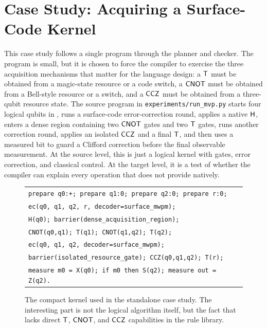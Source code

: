 \section{Case Study: Acquiring a Surface-Code Kernel}
\label{sec:case-study}

This case study follows a single  program through the planner and checker.
The program is small, but it is chosen to force the compiler to exercise the three acquisition mechanisms that matter for the language design: a $\mathsf{T}$ must be obtained from a magic-state resource or a code switch, a $\mathsf{CNOT}$ must be obtained from a Bell-style resource or a switch, and a $\mathsf{CCZ}$ must be obtained from a three-qubit resource state.
The source program in \texttt{experiments/run\_mvp.py} starts four logical qubits in , runs a surface-code error-correction round, applies a native $\mathsf{H}$, enters a dense region containing two $\mathsf{CNOT}$ gates and two $\mathsf{T}$ gates, runs another correction round, applies an isolated $\mathsf{CCZ}$ and a final $\mathsf{T}$, and then uses a measured bit to guard a Clifford correction before the final observable measurement.
At the source level, this is just a logical kernel with gates, error correction, and classical control.
At the target level, it is a test of whether the compiler can explain every operation that  does not provide natively.

\begin{figure}[t]
\centering
\begin{tabular}{l}
\texttt{prepare q0:+; prepare q1:0; prepare q2:0; prepare r:0;}\\
\texttt{ec(q0, q1, q2, r, decoder=surface\_mwpm);}\\
\texttt{H(q0); barrier(dense\_acquisition\_region);}\\
\texttt{CNOT(q0,q1); T(q1); CNOT(q1,q2); T(q2);}\\
\texttt{ec(q0, q1, q2, decoder=surface\_mwpm);}\\
\texttt{barrier(isolated\_resource\_gate); CCZ(q0,q1,q2); T(r);}\\
\texttt{measure m0 = X(q0); if m0 then S(q2); measure out = Z(q2).}
\end{tabular}
\caption{The compact  kernel used in the standalone case study. The interesting part is not the logical algorithm itself, but the fact that  lacks direct $\mathsf{T}$, $\mathsf{CNOT}$, and $\mathsf{CCZ}$ capabilities in the rule library.}
\label{fig:surface-kernel}
\end{figure}

